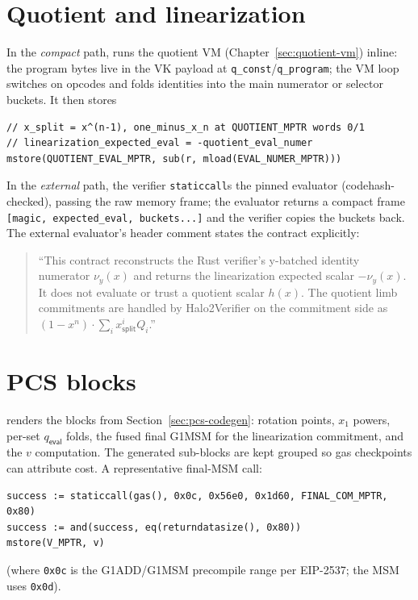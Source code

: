 \section{Quotient and linearization}
\label{sec:quotient-render}

In the \emph{compact} path,  runs the
quotient VM (Chapter~\ref{sec:quotient-vm}) inline: the program bytes
live in the VK payload at \texttt{q\_\allowbreak{}const}/\texttt{q\_\allowbreak{}program}; the VM
loop switches on opcodes and folds identities into the main numerator or
selector buckets. It then stores
\begin{lstlisting}[style=yul]
// x_split = x^(n-1), one_minus_x_n at QUOTIENT_MPTR words 0/1
// linearization_expected_eval = -quotient_eval_numer
mstore(QUOTIENT_EVAL_MPTR, sub(r, mload(EVAL_NUMER_MPTR)))
\end{lstlisting}
In the \emph{external} path, the verifier \texttt{staticcall}s the pinned
evaluator (codehash-checked), passing the raw memory frame; the evaluator
returns a compact frame \texttt{[magic, expected\_\allowbreak{}eval, buckets...]} and
the verifier copies the buckets back. The external evaluator's header
comment states the contract explicitly:
\begin{quote}\small
``This contract reconstructs the Rust verifier's y-batched identity
numerator $\nu_y(x)$ and returns the linearization expected scalar
$-\nu_y(x)$. It does not evaluate or trust a quotient scalar $h(x)$. The
quotient limb commitments are handled by Halo2Verifier on the commitment
side as $(1-x^n)\cdot\sum_i x_{\mathsf{split}}^i Q_i$.''
\end{quote}

\section{PCS blocks}
\label{sec:sol-pcs}

 renders the  blocks from
Section~\ref{sec:pcs-codegen}: rotation points, $x_1$ powers, per-set
$q_{\mathsf{eval}}$ folds, the fused final G1MSM for the linearization
commitment, and the $v$ computation. The generated sub-blocks are kept
grouped so gas checkpoints can attribute cost. A representative final-MSM
call:
\begin{lstlisting}[style=yul]
success := staticcall(gas(), 0x0c, 0x56e0, 0x1d60, FINAL_COM_MPTR, 0x80)
success := and(success, eq(returndatasize(), 0x80))
mstore(V_MPTR, v)
\end{lstlisting}
(where \texttt{0x0c} is the G1ADD/G1MSM precompile range per EIP-2537;
the MSM uses \texttt{0x0d}).

